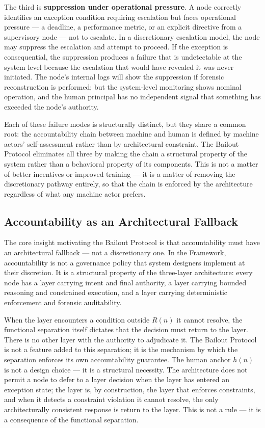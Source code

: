 The third is \textbf{suppression under operational pressure}. A node correctly identifies an exception condition requiring escalation but faces operational pressure --- a deadline, a performance metric, or an explicit directive from a supervisory node --- not to escalate. In a discretionary escalation model, the node may suppress the escalation and attempt to proceed. If the exception is consequential, the suppression produces a failure that is undetectable at the system level because the escalation that would have revealed it was never initiated. The node's internal logs will show the suppression if forensic reconstruction is performed; but the system-level monitoring shows nominal operation, and the human principal has no independent signal that something has exceeded the node's authority.

Each of these failure modes is structurally distinct, but they share a common root: the accountability chain between machine and human is defined by machine actors' self-assessment rather than by architectural constraint. The Bailout Protocol eliminates all three by making the chain a structural property of the system rather than a behavioral property of its components. This is not a matter of better incentives or improved training --- it is a matter of removing the discretionary pathway entirely, so that the chain is enforced by the architecture regardless of what any machine actor prefers.

\subsection{Accountability as an Architectural Fallback}

The core insight motivating the Bailout Protocol is that accountability must have an architectural fallback --- not a discretionary one. In the \bxthree{} Framework, accountability is not a governance policy that system designers implement at their discretion. It is a structural property of the three-layer architecture: every node has a \purpose{} layer carrying intent and final authority, a \bounds{} layer carrying bounded reasoning and constrained execution, and a \fact{} layer carrying deterministic enforcement and forensic auditability.

When the \bounds{} layer encounters a condition outside $R(n)$ it cannot resolve, the functional separation itself dictates that the decision must return to the \purpose{} layer. There is no other layer with the authority to adjudicate it. The Bailout Protocol is not a feature added to this separation; it is the mechanism by which the separation enforces its own accountability guarantee. The human anchor $h(n)$ is not a design choice --- it is a structural necessity. The architecture does not permit a node to defer to a \bounds{} layer decision when the \bounds{} layer has entered an exception state; the \bounds{} layer is, by construction, the layer that enforces constraints, and when it detects a constraint violation it cannot resolve, the only architecturally consistent response is return to the \purpose{} layer. This is not a rule --- it is a consequence of the functional separation.

